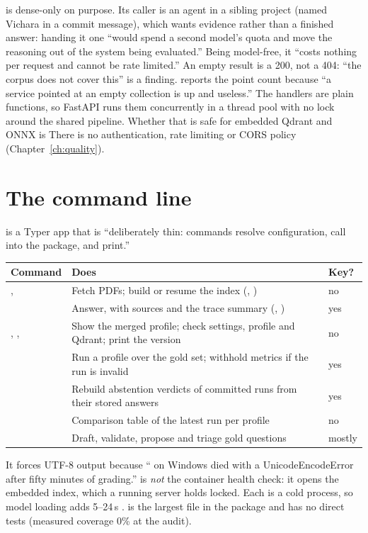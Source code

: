  is dense-only on purpose. Its caller is an agent in a sibling project (named Vichara in a commit message), which wants evidence rather than a finished answer: handing it one ``would spend a second model's quota and move the reasoning out of the system being evaluated.'' Being model-free, it ``costs nothing per request and cannot be rate limited.'' An empty result is a 200, not a 404: ``the corpus does not cover this'' is a finding.  reports the point count because ``a service pointed at an empty collection is up and useless.'' The handlers are plain  functions, so FastAPI runs them concurrently in a thread pool with no lock around the shared pipeline. Whether that is safe for embedded Qdrant and ONNX is \NotDet{} There is no authentication, rate limiting or CORS policy (Chapter~\ref{ch:quality}).

\section{The command line}

 is a Typer app that is ``deliberately thin: commands resolve configuration, call into the package, and print.''
\begin{center}\small
\begin{tabularx}{\textwidth}{@{}>{\raggedright\arraybackslash}p{3.6cm}L>{\centering\arraybackslash}p{1.4cm}@{}}
\toprule
\textbf{Command} & \textbf{Does} & \textbf{Key?}\\
\midrule
{},  & Fetch PDFs; build or resume the index (, ) & no\\
 & Answer, with sources and the trace summary (, ) & yes\\
, ,  & Show the merged profile; check settings, profile and Qdrant; print the version & no\\
 & Run a profile over the gold set; withhold metrics if the run is invalid & yes\\
 & Rebuild abstention verdicts of committed runs from their stored answers & yes\\
 & Comparison table of the latest run per profile & no\\
 & Draft, validate, propose and triage gold questions & mostly\\
\bottomrule
\end{tabularx}
\end{center}
It forces UTF-8 output because `` on Windows died with a UnicodeEncodeError after fifty minutes of grading.''  is \emph{not} the container health check: it opens the embedded index, which a running server holds locked. Each  is a cold process, so model loading adds 5--24\,s \tagM.  is the largest file in the package and has no direct tests (measured coverage 0\% at the audit).

